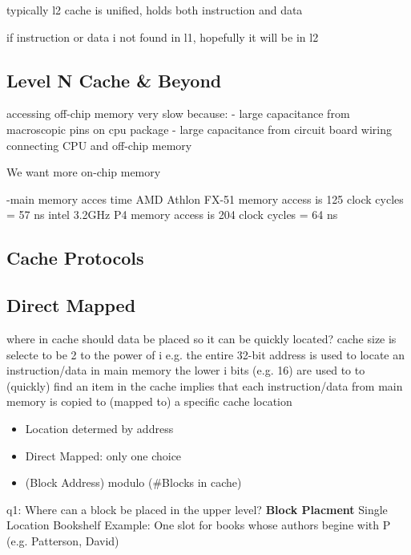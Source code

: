typically l2 cache is unified, holds both instruction and data

if instruction or data i not found in l1, hopefully it will be in l2


\subsection{Level N Cache \& Beyond}
accessing off-chip memory very slow because:
- large capacitance from macroscopic pins on cpu package
- large capacitance from circuit board wiring connecting CPU and off-chip memory

We want more on-chip memory


-main memory acces time
AMD Athlon FX-51 memory access is 125 clock cycles = 57 ns
intel 3.2GHz P4 memory access is 204 clock cycles = 64 ns

\subsection{Cache Protocols}


\subsection{Direct Mapped}
where in cache should data be placed so it can be quickly located?
cache size is selecte to be 2 to the power of i e.g.
the entire 32-bit address is used to locate an instruction/data in main memory
the lower i bits (e.g. 16) are used to to (quickly) find an item in the cache
implies that each instruction/data from main memory is copied to (mapped to) a specific
cache location

\begin{itemize}
\item Location determed by address
\item Direct Mapped: only one choice
\item (Block Address) modulo (\#Blocks in cache)
\end{itemize}

q1: Where can a block be placed in the upper level? \newline
\textbf{Block Placment} \newline
Single Location
Bookshelf Example: One slot for books whose authors begine with P (e.g. Patterson, David)

